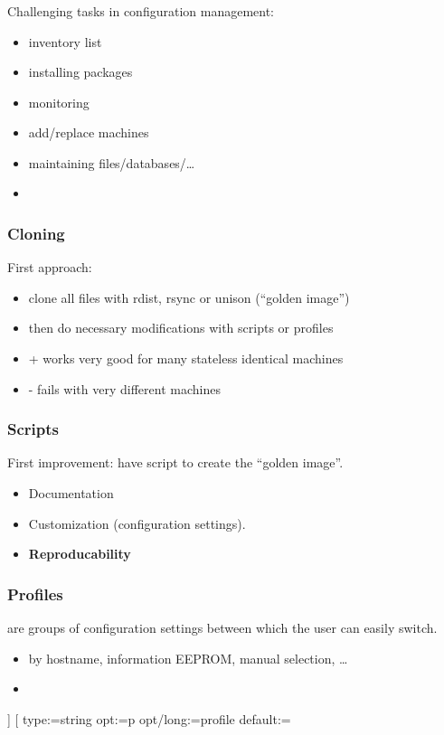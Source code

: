 \begin{frame}
	\frametitle{}

	Challenging tasks in configuration management:

	\pause

	\begin{itemize}
	\item inventory list
	\item installing packages
	\item monitoring
	\item add/replace machines
	\item maintaining files/databases/\dots
	\item {}
	\end{itemize}
\end{frame}


\begin{frame}
	\frametitle{Cloning}

	First approach:

	\begin{itemize}
	\item clone all files with rdist, rsync or unison (``golden image'')
	\item then do necessary modifications with scripts or profiles
	\item + works very good for many stateless identical machines
	\item - fails with very different machines
	\end{itemize}
\end{frame}

\begin{frame}
	\frametitle{Scripts}

	First improvement: have script to create the ``golden image''.

	\begin{itemize}
	\item Documentation
	\item Customization (configuration settings).
	\item \textbf{Reproducability}
	\end{itemize}
\end{frame}

\begin{frame}[fragile]
	\frametitle{Profiles}

	 are groups of configuration settings between which the user can easily switch.

	\begin{itemize}
	\item by hostname, information EEPROM, manual selection, \dots
	\item 
	\end{itemize}

	\begin{code}[morekeywords={long},gobble=4]]
	[%
	  type:=string
	  opt:=p
	  opt/long:=profile
	  default:=
	\end{code}
\end{frame}


